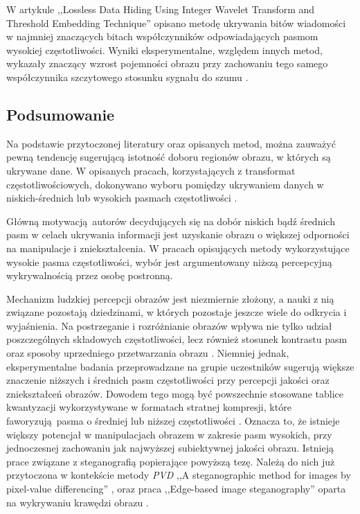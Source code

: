 {{{            W artykule ,,Lossless Data Hiding Using Integer Wavelet Transform and Threshold Embedding
            Technique'' opisano metodę ukrywania bitów wiadomości w najmniej znaczących bitach współczynników
            odpowiadających pasmom wysokiej częstotliwości. Wyniki eksperymentalne, względem innych metod, wykazały
            znaczący wzrost pojemności obrazu przy zachowaniu tego samego współczynnika szczytowego stosunku sygnału do
            szumu \cite{Xuan2005LosslessDH}.
        }

        \subsection{Podsumowanie}
        {
            Na podstawie przytoczonej literatury oraz opisanych metod, można zauważyć pewną tendencję sugerującą
            istotność doboru regionów obrazu, w których są ukrywane dane. W opisanych pracach, korzystających z
            transformat częstotliwościowych, dokonywano wyboru pomiędzy ukrywaniem danych w
            niskich-średnich \cite{Huang2000EmbeddingIW, DataHidinginJPEG, Li2007ASM} lub wysokich pasmach
            częstotliwości \cite{Xuan2005LosslessDH, Muhuri2020ANI}.

            Główną motywacją autorów decydujących się na dobór niskich bądź średnich pasm w celach ukrywania informacji
            jest uzyskanie obrazu o większej odporności na manipulacje i zniekształcenia. W pracach opisujących metody
            wykorzystujące wysokie pasma częstotliwości, wybór jest argumentowany niższą percepcyjną wykrywalnością
            przez osobę postronną.

            Mechanizm ludzkiej percepcji obrazów jest niezmiernie złożony, a nauki z nią związane pozostają dziedzinami,
            w których pozostaje jeszcze wiele do odkrycia i wyjaśnienia. Na postrzeganie i rozróżnianie obrazów wpływa
            nie tylko udział poszczególnych składowych częstotliwości, lecz również stosunek kontrastu pasm oraz sposoby
            uprzedniego przetwarzania obrazu \cite{Perfetto2020EffectsOS}. Niemniej jednak, eksperymentalne badania
            przeprowadzane na grupie uczestników sugerują większe znaczenie niższych i średnich pasm częstotliwości przy
            percepcji jakości oraz zniekształceń obrazów. Dowodem tego mogą być powszechnie stosowane tablice
            kwantyzacji wykorzystywane w formatach stratnej kompresji, które faworyzują pasma o średniej lub niższej
            częstotliwości \cite{ImageCompressionDCT}. Oznacza to, że istnieje większy potencjał w manipulacjach obrazem
            w zakresie pasm wysokich, przy jednoczesnej zachowaniu jak najwyższej subiektywnej jakości obrazu. Istnieją
            prace związane z steganografią popierające powyższą tezę. Należą do nich już przytoczona w kontekście metody
            \textit{PVD} ,,A steganographic method for images by pixel-value differencing'' \cite{Wu2003ASM}, oraz praca
            ,,Edge-based image steganography'' oparta na wykrywaniu krawędzi obrazu \cite{Islam2014EdgebasedIS}.
        }
    }
}

